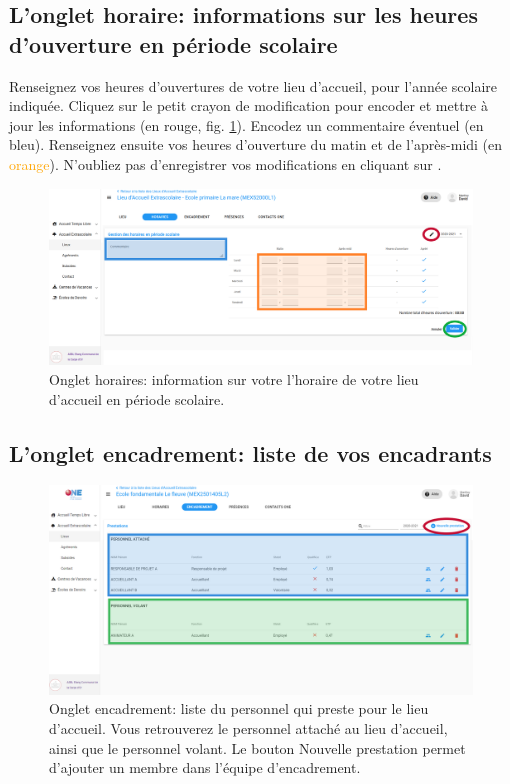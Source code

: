 \subsection{L'onglet horaire: informations sur les heures d'ouverture en période scolaire}    \label{subsec:aes_horaire}
Renseignez vos heures d'ouvertures de votre lieu d'accueil, pour l'année scolaire indiquée. Cliquez sur le petit crayon de modification pour encoder et mettre à jour les informations (en \textcolor{rouge}{rouge}, fig. \ref{fig:aes_horaires}). Encodez un commentaire éventuel (en \textcolor{bleu}{bleu}). Renseignez ensuite vos heures d'ouverture du matin et de l'après-midi (en \textcolor{orange}{orange}). N'oubliez pas d'enregistrer vos modifications en cliquant sur . 

\begin{figure}[h!]
    \centering
    \includegraphics[width=15cm]{Images/aes/horaire2.png}
    \caption{Onglet horaires: information sur votre l'horaire de votre lieu d'accueil en période scolaire.}
    \label{fig:aes_horaires}
\end{figure}



\subsection{L'onglet encadrement: liste de vos encadrants}

\begin{figure}
    \centering
    \includegraphics[width=15cm]{Images/aes/encadrement.png}
    \caption{Onglet encadrement: liste du personnel qui preste pour le lieu d'accueil. Vous retrouverez le personnel attaché au lieu d'accueil, ainsi que le personnel volant. Le bouton Nouvelle prestation permet d'ajouter un membre dans l'équipe d'encadrement.}
    \label{fig:aes_encadrement}
\end{figure}


